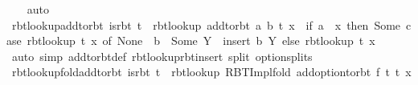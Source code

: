 \begin{isabellebody}
\ \ \isamarkupfalse%
\isanewline
{}\isamarkupfalse%
\ auto%
\endisatagproof
{\isafoldproof}%
%
\isadelimproof
\isanewline
%
\endisadelimproof
\isanewline
{}\isamarkupfalse%
\ rbt{\isacharunderscore}{\kern0pt}lookup{\isacharunderscore}{\kern0pt}add{\isacharunderscore}{\kern0pt}to{\isacharunderscore}{\kern0pt}rbt{\isacharcolon}{\kern0pt}\ {\isachardoublequoteopen}is{\isacharunderscore}{\kern0pt}rbt\ t\ {\isasymLongrightarrow}\ rbt{\isacharunderscore}{\kern0pt}lookup\ {\isacharparenleft}{\kern0pt}add{\isacharunderscore}{\kern0pt}to{\isacharunderscore}{\kern0pt}rbt\ {\isacharparenleft}{\kern0pt}a{\isacharcomma}{\kern0pt}\ b{\isacharparenright}{\kern0pt}\ t{\isacharparenright}{\kern0pt}\ x\ {\isacharequal}{\kern0pt}\ {\isacharparenleft}{\kern0pt}if\ a\ {\isacharequal}{\kern0pt}\ x\ then\ Some\ {\isacharparenleft}{\kern0pt}case\ rbt{\isacharunderscore}{\kern0pt}lookup\ t\ x\ of\ None\ {\isasymRightarrow}\ {\isacharbraceleft}{\kern0pt}b{\isacharbraceright}{\kern0pt}\ {\isacharbar}{\kern0pt}\ Some\ Y\ {\isasymRightarrow}\ insert\ b\ Y{\isacharparenright}{\kern0pt}\ else\ rbt{\isacharunderscore}{\kern0pt}lookup\ t\ x{\isacharparenright}{\kern0pt}{\isachardoublequoteclose}\isanewline
%
\isadelimproof
\ \ %
\endisadelimproof
%
\isatagproof
{}\isamarkupfalse%
\ {\isacharparenleft}{\kern0pt}auto\ simp{\isacharcolon}{\kern0pt}\ add{\isacharunderscore}{\kern0pt}to{\isacharunderscore}{\kern0pt}rbt{\isacharunderscore}{\kern0pt}def\ rbt{\isacharunderscore}{\kern0pt}lookup{\isacharunderscore}{\kern0pt}rbt{\isacharunderscore}{\kern0pt}insert\ split{\isacharcolon}{\kern0pt}\ option{\isachardot}{\kern0pt}splits{\isacharparenright}{\kern0pt}%
\endisatagproof
{\isafoldproof}%
%
\isadelimproof
\isanewline
%
\endisadelimproof
\isanewline
{}\isamarkupfalse%
\ rbt{\isacharunderscore}{\kern0pt}lookup{\isacharunderscore}{\kern0pt}fold{\isacharunderscore}{\kern0pt}add{\isacharunderscore}{\kern0pt}to{\isacharunderscore}{\kern0pt}rbt{\isacharcolon}{\kern0pt}\ {\isachardoublequoteopen}is{\isacharunderscore}{\kern0pt}rbt\ t{\isacharprime}{\kern0pt}\ {\isasymLongrightarrow}\ rbt{\isacharunderscore}{\kern0pt}lookup\ {\isacharparenleft}{\kern0pt}RBT{\isacharunderscore}{\kern0pt}Impl{\isachardot}{\kern0pt}fold\ {\isacharparenleft}{\kern0pt}add{\isacharunderscore}{\kern0pt}option{\isacharunderscore}{\kern0pt}to{\isacharunderscore}{\kern0pt}rbt\ f{\isacharparenright}{\kern0pt}\ t\ t{\isacharprime}{\kern0pt}{\isacharparenright}{\kern0pt}\ x\ {\isacharequal}{\kern0pt}\isanewline

\end{isabellebody}
